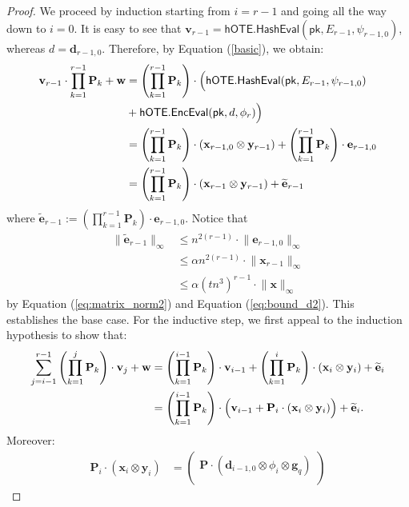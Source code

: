 \documentclass{theoretics}
\newcommand{\BOTE}{\mathsf{hOTE}}
\newcommand{\algofont}[1]{\ensuremath{\mathsf{#1}}}
\newcommand{\Enc}{{\algofont{Enc}}}
\newcommand{\Eval}{\algofont{Eval}\xspace}
\newcommand{\Hash}{{\algofont{Hash}}}
\newcommand{\pk}{{\mathsf{pk}}}
\begin{document}
\begin{proof}
We proceed by induction starting from $i=r-1$ and going all the way down to $i=0$.
It is easy to see that $\mathbf{v}_{r-1}= \BOTE.\Hash\Eval(\pk, E_{r-1}, \psi_{r-1,0})$, whereas $d=\mathbf{d}_{r-1,0}$. Therefore, by Equation (\ref{basic}), we obtain:
\begin{align*}\mathbf{v}_{r-1}\cdot \prod_{k=1}^{r-1} \mathbf{P}_k+\mathbf{w}&=\left(\prod_{k=1}^{r-1} \mathbf{P}_k\right)\cdot \Bigl(\BOTE.\Hash\Eval(\pk, E_{r-1}, \psi_{r-1,0})\\
&+\BOTE.\Enc\Eval(\pk, d, \phi_r)\Bigr)\\
&=\left(\prod_{k=1}^{r-1} \mathbf{P}_k\right)\cdot (\mathbf{x}_{r-1,0}\otimes \mathbf{y}_{r-1})+\left(\prod_{k=1}^{r-1} \mathbf{P}_k\right)\cdot\mathbf{e}_{r-1,0}\\
&=\left(\prod_{k=1}^{r-1} \mathbf{P}_k\right)\cdot(\mathbf{x}_{r-1}\otimes \mathbf{y}_{r-1})+\widetilde{\mathbf{e}}_{r-1}\end{align*}
where $\widetilde{\mathbf{e}}_{r-1}:=\left(\prod_{k=1}^{r-1} \mathbf{P}_k\right)\cdot\mathbf{e}_{r-1,0}$. Notice that 
\begin{align*}\lVert\widetilde{\mathbf{e}}_{r-1}\rVert_\infty&\le n^{2(r-1)}\cdot \lVert \mathbf{e}_{r-1,0}\rVert_\infty\\
&\le \alpha n^{2(r-1)}\cdot \lVert \mathbf{x}_{r-1}\rVert_\infty\\
&\le \alpha (t n^3)^{r-1}\cdot \lVert \mathbf{x}\rVert_\infty\end{align*}
by Equation (\ref{eq:matrix_norm2}) and Equation (\ref{eq:bound_d2}).
This establishes the base case. For the inductive step, we first appeal to the induction hypothesis to show that:
\begin{align*}\sum_{j=i-1}^{r-1}\left(\prod_{k=1}^{j} \mathbf{P}_k\right)\cdot\mathbf{v}_{j}+\mathbf{w}&=\left(\prod_{k=1}^{i-1} \mathbf{P}_k\right)\cdot \mathbf{v}_{i-1}+\left(\prod_{k=1}^{i} \mathbf{P}_k\right)\cdot(\mathbf{x}_{i}\otimes \mathbf{y}_i)+\widetilde{\mathbf{e}}_i\\
&=\left(\prod_{k=1}^{i-1} \mathbf{P}_k\right)\cdot\Bigl(\mathbf{v}_{i-1}+\mathbf{P}_i\cdot(\mathbf{x}_{i}\otimes \mathbf{y}_i)\Bigr)+\widetilde{\mathbf{e}}_i.\end{align*}
 Moreover:
\begin{align*}
\mathbf{P}_i\cdot (\mathbf{x}_i\otimes \mathbf{y}_i)&=\begin{pmatrix} \mathbf{P}\cdot (\mathbf{d}_{i-1,0}\otimes \phi_i\otimes \mathbf{g}_q)\\

\end{pmatrix}
\end{align*}
\end{proof}
\end{document}
